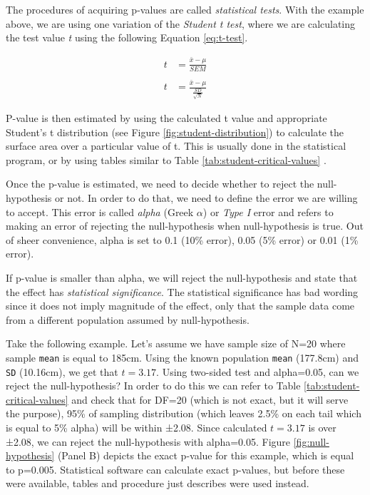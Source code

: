 \documentclass[
]{book}
\begin{document}
The procedures of acquiring p-values are called \emph{statistical tests}. With the example above, we are using one variation of the \emph{Student t test}, where we are calculating the test value \emph{t} using the following Equation \eqref{eq:t-test}.

\begin{equation}
  \begin{split}
  t &= \frac{\bar{x} -\mu}{SEM} \\
  \\
  t &= \frac{\bar{x} -\mu}{\frac{SD}{\sqrt{N}}}
  \end{split}
  \label{eq:t-test}
\end{equation}

P-value is then estimated by using the calculated t value and appropriate Student's t distribution (see Figure \ref{fig:student-distribution}) to calculate the surface area over a particular value of t. This is usually done in the statistical program, or by using tables similar to Table \ref{tab:student-critical-values} .

Once the p-value is estimated, we need to decide whether to reject the null-hypothesis or not. In order to do that, we need to define the error we are willing to accept. This error is called \emph{alpha} (Greek \(\alpha\)) or \emph{Type I} error and refers to making an error of rejecting the null-hypothesis when null-hypothesis is true. Out of sheer convenience, alpha is set to 0.1 (10\% error), 0.05 (5\% error) or 0.01 (1\% error).

If p-value is smaller than alpha, we will reject the null-hypothesis and state that the effect has \emph{statistical significance}. The statistical significance has bad wording since it does not imply magnitude of the effect, only that the sample data come from a different population assumed by null-hypothesis.

Take the following example. Let's assume we have sample size of N=20 where sample \texttt{mean} is equal to 185cm. Using the known population \texttt{mean} (177.8cm) and \texttt{SD} (10.16cm), we get that \(t=3.17\). Using two-sided test and alpha=0.05, can we reject the null-hypothesis? In order to do this we can refer to Table \ref{tab:student-critical-values} and check that for DF=20 (which is not exact, but it will serve the purpose), 95\% of sampling distribution (which leaves 2.5\% on each tail which is equal to 5\% alpha) will be within ±2.08. Since calculated \(t=3.17\) is over ±2.08, we can reject the null-hypothesis with alpha=0.05. Figure \ref{fig:null-hypothesis} (Panel B) depicts the exact p-value for this example, which is equal to p=0.005. Statistical software can calculate exact p-values, but before these were available, tables and procedure just describes were used instead.
\end{document}
